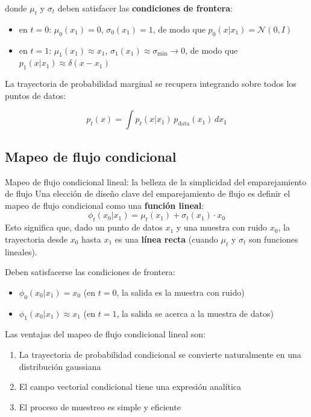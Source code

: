 \documentclass[a4paper]{article}
\begin{document}
donde $\mu_t$ y $\sigma_t$ deben satisfacer las \textbf{condiciones de frontera}:
\begin{itemize}
    \item en $t = 0$: $\mu_0(x_1) = 0$, $\sigma_0(x_1) = 1$, de modo que $p_0(x | x_1) = \mathcal{N}(0, I)$
    \item en $t = 1$: $\mu_1(x_1) \approx x_1$, $\sigma_1(x_1) \approx \sigma_{\min} \to 0$, de modo que $p_1(x | x_1) \approx \delta(x - x_1)$
\end{itemize}

La trayectoria de probabilidad marginal se recupera integrando sobre todos los puntos de datos:

$$p_t(x) = \int p_t(x | x_1) \, p_{\text{data}}(x_1) \, dx_1$$

\subsection{Mapeo de flujo condicional}

\begin{importantbox}{Mapeo de flujo condicional lineal: la belleza de la simplicidad del emparejamiento de flujo}
Una elección de diseño clave del emparejamiento de flujo es definir el mapeo de flujo condicional como una \textbf{función lineal}:
$$\phi_t(x_0 | x_1) = \mu_t(x_1) + \sigma_t(x_1) \cdot x_0$$
Esto significa que, dado un punto de datos $x_1$ y una muestra con ruido $x_0$, la trayectoria desde $x_0$ hasta $x_1$ es una \textbf{línea recta} (cuando $\mu_t$ y $\sigma_t$ son funciones lineales).

Deben satisfacerse las condiciones de frontera:
\begin{itemize}
    \item $\phi_0(x_0 | x_1) = x_0$ (en $t=0$, la salida es la muestra con ruido)
    \item $\phi_1(x_0 | x_1) \approx x_1$ (en $t=1$, la salida se acerca a la muestra de datos)
\end{itemize}
\end{importantbox}

Las ventajas del mapeo de flujo condicional lineal son:
\begin{enumerate}
    \item La trayectoria de probabilidad condicional se convierte naturalmente en una distribución gaussiana
    \item El campo vectorial condicional tiene una expresión analítica
    \item El proceso de muestreo es simple y eficiente
\end{enumerate}
\end{document}

